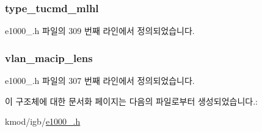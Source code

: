 \subsubsection[{\texorpdfstring{type\+\_\+tucmd\+\_\+mlhl}{type_tucmd_mlhl}}]{ type\+\_\+tucmd\+\_\+mlhl}\hypertarget{structe1000__adv__tx__context__desc_a251c33f69d1fa3c146567989e12b0a01}{}\label{structe1000__adv__tx__context__desc_a251c33f69d1fa3c146567989e12b0a01}


e1000\+\_.\+h 파일의 309 번째 라인에서 정의되었습니다.

\subsubsection[{\texorpdfstring{vlan\+\_\+macip\+\_\+lens}{vlan_macip_lens}}]{ vlan\+\_\+macip\+\_\+lens}\hypertarget{structe1000__adv__tx__context__desc_a5a8c54c0a1c30c075af11263ab99321d}{}\label{structe1000__adv__tx__context__desc_a5a8c54c0a1c30c075af11263ab99321d}


e1000\+\_.\+h 파일의 307 번째 라인에서 정의되었습니다.



이 구조체에 대한 문서화 페이지는 다음의 파일로부터 생성되었습니다.\+:\begin{DoxyCompactItemize}
\item 
kmod/igb/\hyperlink{kmod_2igb_2e1000__82575_8h}{e1000\+\_.\+h}\end{DoxyCompactItemize}
